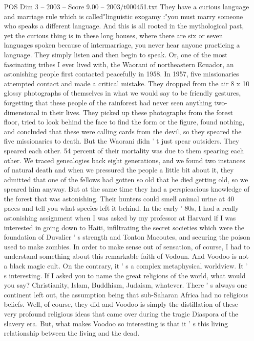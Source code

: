 \begin{textsample}{POS Dim 3 – 2003 – Score 9.00 – 2003/t000451.txt}
They have a curious language and marriage rule which is called"linguistic exogamy :"you must marry someone who speaks a different language.
And this is all rooted in the mythological past, yet the curious thing is in these long houses, where there are six or seven languages spoken because of intermarriage, you never hear anyone practicing a language.
They simply listen and then begin to speak.
Or, one of the most fascinating tribes I ever lived with, the Waorani of northeastern Ecuador, an astonishing people first contacted peacefully in 1958.
In 1957, five missionaries attempted contact and made a critical mistake.
They dropped from the air 8 x 10 glossy photographs of themselves in what we would say to be friendly gestures, forgetting that these people of the rainforest had never seen anything two-dimensional in their lives.
They picked up these photographs from the forest floor, tried to look behind the face to find the form or the figure, found nothing, and concluded that these were calling cards from the devil, so they speared the five missionaries to death.
But the Waorani didn ' t just spear outsiders.
They speared each other. 54 percent of their mortality was due to them spearing each other.
We traced genealogies back eight generations, and we found two instances of natural death and when we pressured the people a little bit about it, they admitted that one of the fellows had gotten so old that he died getting old, so we speared him anyway.
But at the same time they had a perspicacious knowledge of the forest that was astonishing.
Their hunters could smell animal urine at 40 paces and tell you what species left it behind.
In the early ' 80s, I had a really astonishing assignment when I was asked by my professor at Harvard if I was interested in going down to Haiti, infiltrating the secret societies which were the foundation of Duvalier ' s strength and Tonton Macoutes, and securing the poison used to make zombies.
In order to make sense out of sensation, of course, I had to understand something about this remarkable faith of Vodoun.
And Voodoo is not a black magic cult.
On the contrary, it ' s a complex metaphysical worldview.
It ' s interesting.
If I asked you to name the great religions of the world, what would you say?
Christianity, Islam, Buddhism, Judaism, whatever.
There ' s always one continent left out, the assumption being that sub-Saharan Africa had no religious beliefs.
Well, of course, they did and Voodoo is simply the distillation of these very profound religious ideas that came over during the tragic Diaspora of the slavery era.
But, what makes Voodoo so interesting is that it ' s this living relationship between the living and the dead.

\end{textsample}
